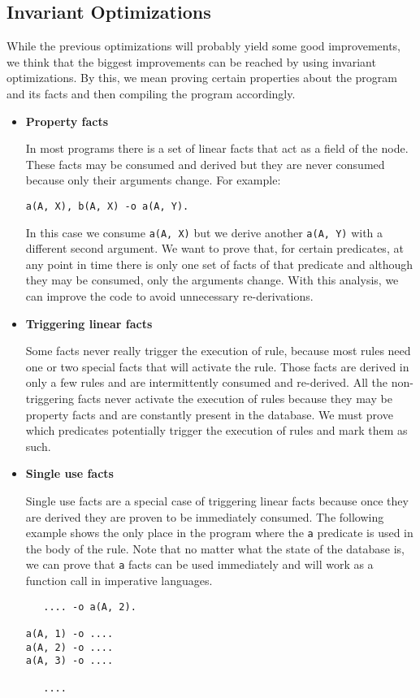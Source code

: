 \subsection{Invariant Optimizations}

While the previous optimizations will probably yield some good improvements, we think that the biggest
improvements can be reached by using invariant optimizations. By this, we mean proving certain
properties about the program and its facts and then compiling the program accordingly.

\begin{itemize}
   
   \item \textbf{Property facts}
   
   In most programs there is a set of linear facts that act as a field of the node. These facts may
   be consumed and derived but they are never consumed because only their arguments change.
   For example:

\begin{Verbatim}
a(A, X), b(A, X) -o a(A, Y).
\end{Verbatim}

   In this case we consume \texttt{a(A, X)} but we derive another \texttt{a(A, Y)} with a different
   second argument. We want to prove that, for certain predicates, at any point in time there is only one
   set of facts of that predicate and although they may be consumed, only the arguments change.
   With this analysis, we can improve the code to avoid unnecessary re-derivations.
   
   \item \textbf{Triggering linear facts}
   
   Some facts never really trigger the execution of rule, because most rules need one or two special facts that
   will activate the rule. Those facts are derived in only a few rules and are intermittently consumed and
   re-derived. All the non-triggering facts never activate the execution of rules because they may be
   property facts and are constantly present in the database.
   We must prove which predicates potentially trigger the execution of rules and mark them as such.
   
   \item \textbf{Single use facts}
   
   Single use facts are a special case of triggering linear facts because once they are derived they are
   proven to be immediately consumed. The following example shows the only place in the program where
   the \texttt{a} predicate is used in the body of the rule. Note that no matter what the state of
   the database is, we can prove that \texttt{a} facts can be used immediately and will work as a function
   call in imperative languages.
   
   \begin{Verbatim}
   .... -o a(A, 2).

a(A, 1) -o ....
a(A, 2) -o ....
a(A, 3) -o ....

   ....
   \end{Verbatim}
    
\end{itemize}

